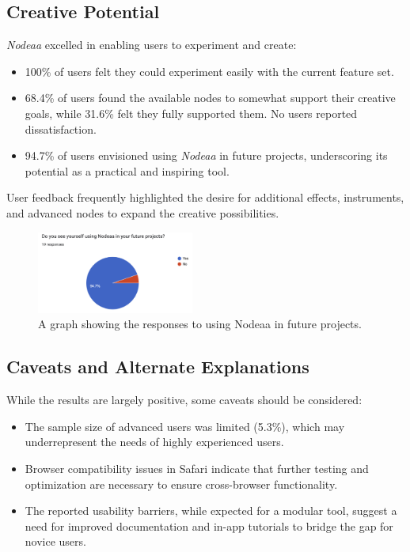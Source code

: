 \documentclass[10pt,twocolumn]{article}
\begin{document}
\subsection{Creative Potential}
\textit{Nodeaa} excelled in enabling users to experiment and create:
\begin{itemize}
    \item 100\% of users felt they could experiment easily with the current feature set.
    \item 68.4\% of users found the available nodes to somewhat support their creative goals, while 31.6\% felt they fully supported them. No users reported dissatisfaction.
    \item 94.7\% of users envisioned using \textit{Nodeaa} in future projects, underscoring its potential as a practical and inspiring tool.
\end{itemize}
User feedback frequently highlighted the desire for additional effects, instruments, and advanced nodes to expand the creative possibilities.

\begin{figure}[ht]
    \centering
    \includegraphics[width=0.46\textwidth]{images/surveyuseagain.png}
    \caption{A graph showing the responses to using Nodeaa in future projects.}
    \label{fig:surveyuseagain}
\end{figure}

\subsection{Caveats and Alternate Explanations}
While the results are largely positive, some caveats should be considered:
\begin{itemize}
    \item The sample size of advanced users was limited (5.3\%), which may underrepresent the needs of highly experienced users.
    \item Browser compatibility issues in Safari indicate that further testing and optimization are necessary to ensure cross-browser functionality.
    \item The reported usability barriers, while expected for a modular tool, suggest a need for improved documentation and in-app tutorials to bridge the gap for novice users.
\end{itemize}
\end{document}

